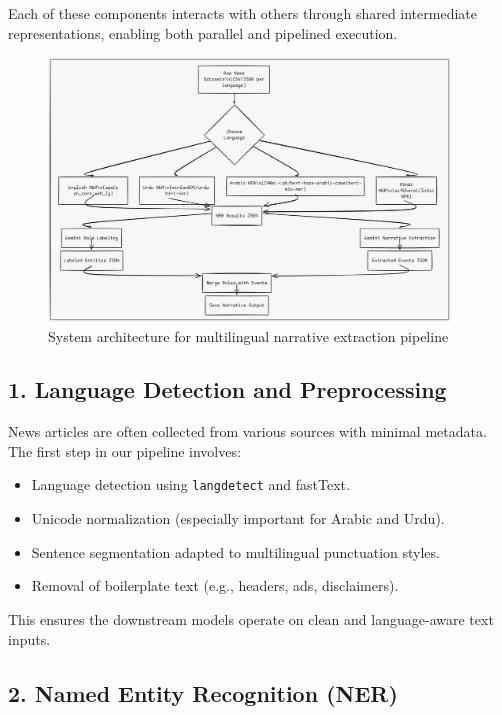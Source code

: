 \documentclass[12pt]{article}
\begin{document}
Each of these components interacts with others through shared intermediate representations, enabling both parallel and pipelined execution.

\begin{figure}[H]
    \centering
    \includegraphics[width=0.95\textwidth]{images/flowchart.png}
    \caption{System architecture for multilingual narrative extraction pipeline}
    \label{fig:architecture}
\end{figure}

\subsection{1. Language Detection and Preprocessing}

News articles are often collected from various sources with minimal metadata. The first step in our pipeline involves:
\begin{itemize}
    \item Language detection using \texttt{langdetect} and fastText.
    \item Unicode normalization (especially important for Arabic and Urdu).
    \item Sentence segmentation adapted to multilingual punctuation styles.
    \item Removal of boilerplate text (e.g., headers, ads, disclaimers).
\end{itemize}

This ensures the downstream models operate on clean and language-aware text inputs.

\subsection{2. Named Entity Recognition (NER)}
\end{document}
